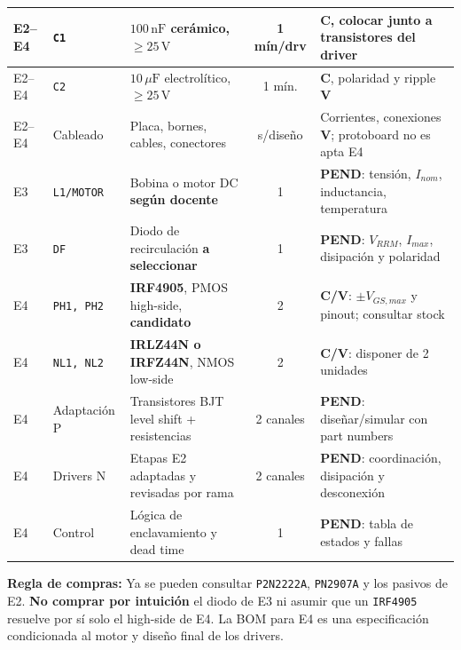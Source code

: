 \documentclass[10pt, a4paper, landscape]{article}
\begin{document}
{\begin{tabularx}{\linewidth}{|p{1.3cm}|p{2.2cm}|p{6.8cm}|c|>{\raggedright\arraybackslash}X|}
E2--E4 & \texttt{C1} & \textbf{$100\,\text{nF}$} cerámico, $\ge 25\,\text{V}$ & 1 mín/drv & \textbf{C}, colocar junto a transistores del driver \\ \hline
E2--E4 & \texttt{C2} & \textbf{$10\,\mu\text{F}$} electrolítico, $\ge 25\,\text{V}$ & 1 mín. & \textbf{C}, polaridad y ripple \textbf{V} \\ \hline
E2--E4 & Cableado & Placa, bornes, cables, conectores & s/diseño & Corrientes, conexiones \textbf{V}; protoboard no es apta E4 \\ \hline
E3 & \texttt{L1/MOTOR} & Bobina o motor DC \textbf{según docente} & 1 & \textbf{PEND}: tensión, $I_{nom}$, inductancia, temperatura \\ \hline
E3 & \texttt{DF} & Diodo de recirculación \textbf{a seleccionar} & 1 & \textbf{PEND}: $V_{RRM}$, $I_{max}$, disipación y polaridad \\ \hline
E4 & \texttt{PH1, PH2} & \textbf{IRF4905}, PMOS high-side, \textbf{candidato} & 2 & \textbf{C/V}: $\pm V_{GS,max}$ y pinout; consultar stock \\ \hline
E4 & \texttt{NL1, NL2} & \textbf{IRLZ44N o IRFZ44N}, NMOS low-side & 2 & \textbf{C/V}: disponer de 2 unidades \\ \hline
E4 & Adaptación P & Transistores BJT level shift + resistencias & 2 canales & \textbf{PEND}: diseñar/simular con part numbers \\ \hline
E4 & Drivers N & Etapas E2 adaptadas y revisadas por rama & 2 canales & \textbf{PEND}: coordinación, disipación y desconexión \\ \hline
E4 & Control & Lógica de enclavamiento y dead time & 1 & \textbf{PEND}: tabla de estados y fallas \\ \hline
\end{tabularx}
}

\vspace{0.3cm}
\noindent
\textbf{Regla de compras:} Ya se pueden consultar \texttt{P2N2222A}, \texttt{PN2907A} y los pasivos de E2. \textbf{No comprar por intuición} el diodo de E3 ni asumir que un \texttt{IRF4905} resuelve por sí solo el high-side de E4. La BOM para E4 es una especificación condicionada al motor y diseño final de los drivers.
\end{document}
